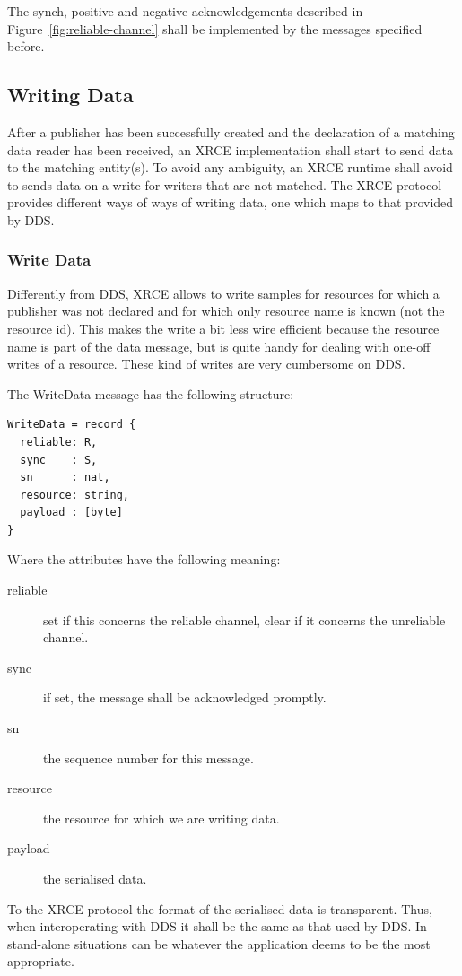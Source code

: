 \documentclass[a4paper,oneside,article]{memoir}
\begin{document}
The synch, positive and negative acknowledgements described in Figure~\ref{fig:reliable-channel}
shall be implemented by the messages specified before.

\subsection{Writing Data}

After a publisher has been successfully created and the declaration of a matching data reader has
been received, an XRCE implementation shall start to send data to the matching entity(s).  To avoid
any ambiguity, an XRCE runtime shall avoid to sends data on a write for writers that are not
matched.  The XRCE protocol provides different ways of ways of writing data, one which maps to that
provided by DDS\@.

\subsubsection{Write Data}

Differently from DDS, XRCE allows to write samples for resources for which a publisher was not
declared and for which only resource name is known (not the resource id).  This makes the write a
bit less wire efficient because the resource name is part of the data message, but is quite handy
for dealing with one-off writes of a resource.  These kind of writes are very cumbersome on DDS\@.

The WriteData message has the following structure:
\begin{verbatim}
WriteData = record {
  reliable: R,
  sync    : S,
  sn      : nat,
  resource: string,
  payload : [byte]
}
\end{verbatim}
Where the attributes have the following meaning:
\begin{description}
\item[reliable] set if this concerns the reliable channel, clear if it concerns the unreliable
  channel.
\item[sync] if set, the message shall be acknowledged promptly.
\item[sn] the sequence number for this message.
\item[resource] the resource for which we are writing data.
\item[payload] the serialised data.
\end{description}
To the XRCE protocol the format of the serialised data is transparent.  Thus, when
interoperating with DDS it shall be the same as that used by DDS\@.  In stand-alone situations can
be whatever the application deems to be the most appropriate.
\end{document}
